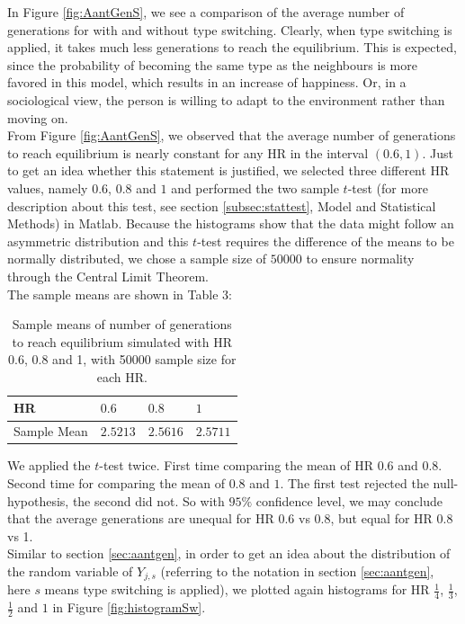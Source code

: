 In Figure \ref{fig:AantGenS}, we see a comparison of the average number of generations for with and without type switching. 
Clearly, when type switching is applied, it takes much less generations to reach the equilibrium. 
This is expected, since the probability of becoming the same type as the neighbours is more favored in this model, which results in an increase of happiness. 
Or, in a sociological view, the person is willing to adapt to the environment rather than moving on.\\

From Figure \ref{fig:AantGenS}, we observed that the average number of generations to reach equilibrium is nearly constant for any HR in the interval \((0.6,1)\). 
Just to get an idea whether this statement is justified, we selected three different HR values, namely $0.6$, $0.8$ and $1$ and performed the two sample \(t\)-test (for more description about this test, see section \ref{subsec:stattest}, Model and Statistical Methods) in Matlab. 
Because the histograms show that the data might follow an asymmetric distribution and this \(t\)-test requires the difference of the means to be normally distributed, we chose a sample size of $50000$ to ensure normality through the Central Limit Theorem.\\

The sample means are shown in Table $3$:
\begin{table}[htp]
\centering
\caption{Sample means of number of generations to reach equilibrium simulated with HR 0.6, 0.8 and 1, with 50000 sample size for each HR.}
\begin{tabular}{|l|l|l|l|}
\hline
 HR&$0.6$&$0.8$&$1$ \\ \hline
 Sample Mean&$2.5213$&$2.5616$&$2.5711$  \\ \hline 
\end{tabular}
\end{table}

We applied the \(t\)-test twice. First time comparing the mean of HR $0.6$ and $0.8$. Second time for comparing the mean of $0.8$ and $1$. The first test rejected the null-hypothesis, the second did not. So with $95\%$ confidence level, we may conclude that the average generations are unequal for HR $0.6$ vs $0.8$, but equal for HR $0.8$ vs 1.\\
\newpage
Similar to section \ref{sec:aantgen}, in order to get an idea about the distribution of the random variable of $Y_{j,s}$ (referring to the notation in section \ref{sec:aantgen}, here \(s\) means type switching is applied), we plotted again histograms for HR $\frac{1}{4}$, $\frac{1}{3}$, $\frac{1}{2}$ and $1$ in Figure \ref{fig:histogramSw}.

